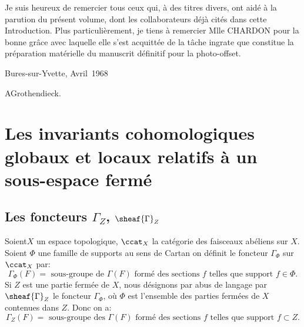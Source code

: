 Je suis heureux de remercier tous ceux qui, \`a des titres divers, ont aid\'e \`a la parution du pr\'esent volume, dont les collaborateurs d\'ej\`a cit\'es dans cette Introduction. Plus particuli\`erement, je tiens \`a remercier Mlle CHARDON pour la bonne gr\^ace avec laquelle elle s'est acquitt\'ee de la t\^ache ingrate que constitue la pr\'eparation mat\'erielle du manuscrit d\'efinitif pour la photo-offset.

\bigskip\hfill Bures-sur-Yvette, Avril~1968
\par\smallskip \hfill A\ptbl Grothendieck.

\chapter[Les invariants cohomologiques globaux et locaux]
{Les invariants cohomologiques globaux et locaux relatifs \`a un sous-espace ferm\'e} \label{I}

\section{Les foncteurs $\Gamma_Z$, $\sheaf{\Gamma}_Z$} \label{I.1}
Soient\pageoriginale $X$ un espace topologique, $\ccat_X$ la cat\'egorie des faisceaux ab\'eliens sur $X$. Soient $\Phi$ une famille de supports au sens de Cartan on d\'efinit le foncteur $\Gamma_\Phi$ sur $\ccat_X$ par:
\begin{equation} \label{eq:I.1} { \Gamma_\Phi(F) = \text{ sous-groupe de } \Gamma(F) \text{ form\'e des sections } f \text{ telles que support } f \in \Phi}.
\end{equation}
Si $Z$ est une partie ferm\'ee de $X$, nous d\'esignons par abus de langage par $\sheaf{\Gamma}_Z$ le foncteur $\Gamma_\Phi$, o\`u $\Phi$ est l'ensemble des parties ferm\'ees de $X$ contenues dans $Z$. Donc on a:
\begin{equation} \label{eq:I.2}
{\Gamma_Z(F) = \text{ sous-groupe des } \Gamma(F) \text{ form\'e des sections } f \text{ telles que support } f \subset Z}.
\end{equation}

